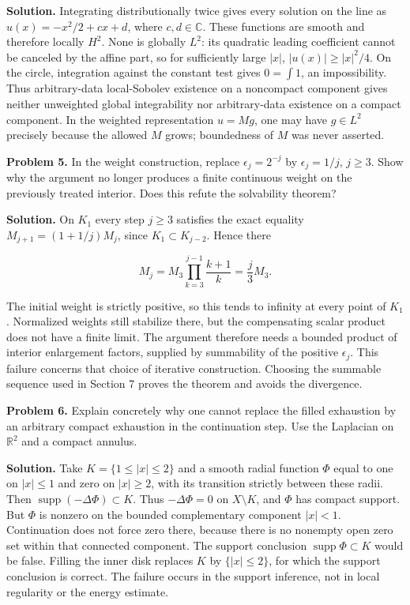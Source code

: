 \documentclass[
  11pt,
]{article}
\begin{document}
\textbf{Solution.} Integrating distributionally twice gives every
solution on the line as \(u(x)=-x^2/2+cx+d\), where \(c,d\in\mathbb C\).
These functions are smooth and therefore locally \(H^2\). None is
globally \(L^2\): its quadratic leading coefficient cannot be canceled
by the affine part, so for sufficiently large \(|x|\),
\(|u(x)|\geq |x|^2/4\). On the circle, integration against the constant
test gives \(0=\int1\), an impossibility. Thus arbitrary-data
local-Sobolev existence on a noncompact component gives neither
unweighted global integrability nor arbitrary-data existence on a
compact component. In the weighted representation \(u=Mg\), one may have
\(g\in L^2\) precisely because the allowed \(M\) grows; boundedness of
\(M\) was never asserted.

\textbf{Problem 5.} In the weight construction, replace
\(\epsilon_j=2^{-j}\) by \(\epsilon_j=1/j\), \(j\geq3\). Show why the
argument no longer produces a finite continuous weight on the previously
treated interior. Does this refute the solvability theorem?

\textbf{Solution.} On \(K_1\) every step \(j\geq3\) satisfies the exact
equality \(M_{j+1}=(1+1/j)M_j\), since \(K_1\subset K_{j-2}\). Hence
there

\[
              M_j=M_3\prod_{k=3}^{j-1}\frac{k+1}{k}
                               =\frac j3M_3.                   \tag{D43}
\]

The initial weight is strictly positive, so this tends to infinity at
every point of \(K_1\). Normalized weights still stabilize there, but
the compensating scalar product does not have a finite limit. The
argument therefore needs a bounded product of interior enlargement
factors, supplied by summability of the positive \(\epsilon_j\). This
failure concerns that choice of iterative construction. Choosing the
summable sequence used in Section 7 proves the theorem and avoids the
divergence.

\textbf{Problem 6.} Explain concretely why one cannot replace the filled
exhaustion by an arbitrary compact exhaustion in the continuation step.
Use the Laplacian on \(\mathbb R^2\) and a compact annulus.

\textbf{Solution.} Take \(K=\{1\leq|x|\leq2\}\) and a smooth radial
function \(\Phi\) equal to one on \(|x|\leq1\) and zero on \(|x|\geq2\),
with its transition strictly between these radii. Then
\(\operatorname{supp}(-\Delta\Phi)\subset K\). Thus \(-\Delta\Phi=0\) on
\(X\setminus K\), and \(\Phi\) has compact support. But \(\Phi\) is
nonzero on the bounded complementary component \(|x|<1\). Continuation
does not force zero there, because there is no nonempty open zero set
within that connected component. The support conclusion
\(\operatorname{supp}\Phi\subset K\) would be false. Filling the inner
disk replaces \(K\) by \(\{|x|\leq2\}\), for which the support
conclusion is correct. The failure occurs in the support inference, not
in local regularity or the energy estimate.
\end{document}
